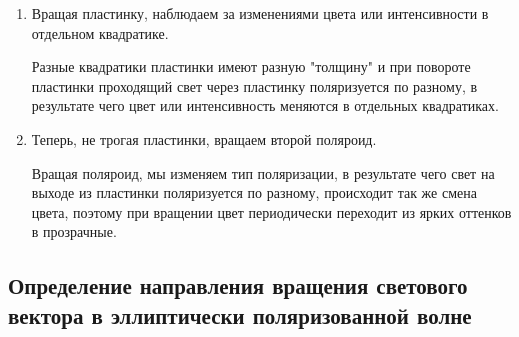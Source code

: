 \documentclass[a4paper,12pt]{article}
\begin{document}
\begin{enumerate}
    \item Вращая пластинку, наблюдаем за изменениями цвета или интенсивности в отдельном квадратике.

    Разные квадратики пластинки имеют разную "толщину" и при повороте пластинки проходящий свет через пластинку поляризуется по разному, в результате чего цвет или интенсивность меняются в отдельных квадратиках.

    \item Теперь, не трогая пластинки, вращаем второй поляроид.

    Вращая поляроид, мы изменяем тип поляризации, в результате чего свет на выходе из пластинки поляризуется по разному, происходит так же смена цвета, поэтому при вращении цвет периодически переходит из ярких оттенков в прозрачные.
\end{enumerate}

\subsection{Определение направления вращения светового вектора в эллиптически поляризованной волне}
\end{document}
